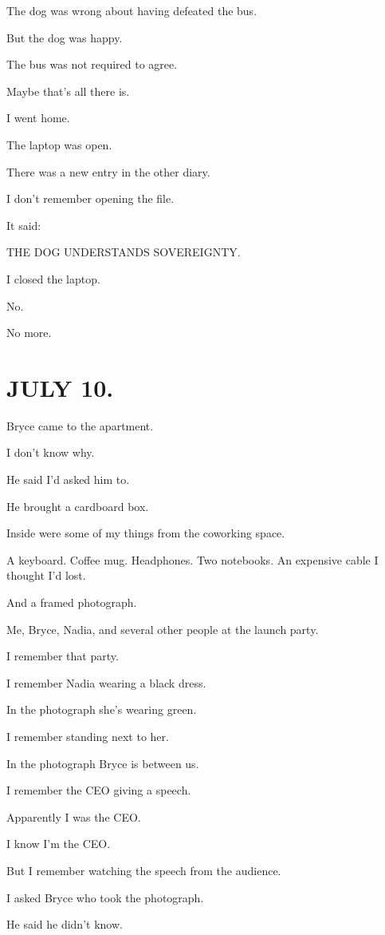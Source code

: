 \documentclass[11pt,oneside]{book}
\begin{document}
The dog was wrong about having defeated the bus.

But the dog was happy.

The bus was not required to agree.

Maybe that's all there is.

I went home.

The laptop was open.

There was a new entry in the other diary.

I don't remember opening the file.

It said:

THE DOG UNDERSTANDS SOVEREIGNTY.

I closed the laptop.

No.

No more.

\section*{JULY 10.}

Bryce came to the apartment.

I don't know why.

He said I'd asked him to.

He brought a cardboard box.

Inside were some of my things from the coworking space.

A keyboard. Coffee mug. Headphones. Two notebooks. An expensive cable I thought I'd lost.

And a framed photograph.

Me, Bryce, Nadia, and several other people at the launch party.

I remember that party.

I remember Nadia wearing a black dress.

In the photograph she's wearing green.

I remember standing next to her.

In the photograph Bryce is between us.

I remember the CEO giving a speech.

Apparently I was the CEO.

I know I'm the CEO.

But I remember watching the speech from the audience.

I asked Bryce who took the photograph.

He said he didn't know.
\end{document}
